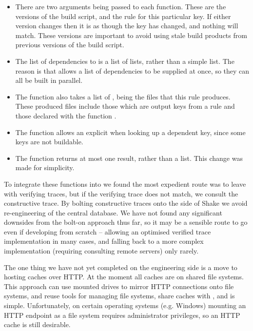 \begin{itemize}
\item There are two  arguments being passed to each function. These are
      the versions of the build script, and the rule for this particular key. If
      either version changes then it is as though the key has changed, and
      nothing will match. These versions are important to avoid using stale
      build products from previous versions of the build script.
\item The list of dependencies to  is a list of lists, rather than
      a simple list. The reason is that \Shake allows a list of dependencies to
      be supplied at once, so they can all be built in parallel.
\item The  function also takes a list of , being the
      files that this rule produces. These produced files include those which
      are output keys from a rule and those declared with the function
      .
\item The  function allows an explicit  when looking
      up a dependent key, since some keys are not buildable.
\item The  function returns at most one result, rather than a
      list. This change was made for simplicity.
\end{itemize}

To integrate these functions into \Shake we found the most expedient route was
to leave \Shake with verifying traces, but if the verifying trace does not
match, we consult the constructive trace. By bolting constructive traces onto
the side of Shake we avoid re-engineering of the central database. We have not
found any significant downsides from the bolt-on approach thus far, so it may be
a sensible route to go even if developing from scratch -- allowing an optimised
verified trace implementation in many cases, and falling back to a more complex
implementation (requiring consulting remote servers) only rarely.

The one thing we have not yet completed on the engineering side is a move to
hosting caches over HTTP. At the moment all caches are on shared file systems.
This approach can use mounted drives to mirror HTTP connections onto file
systems, and reuse tools for managing file systems, share caches with
, and is simple. Unfortunately, on certain operating systems (e.g.
Windows) mounting an HTTP endpoint as a file system requires administrator
privileges, so an HTTP cache is still desirable.

